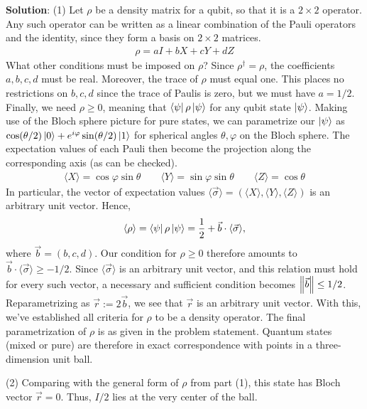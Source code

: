 \documentclass{book}
\begin{document}
    \textbf{Solution}: (1) Let $\rho$ be a density matrix for a qubit, so that it is a $2\times 2$ operator. Any such operator can be written as a linear combination of the Pauli operators and the identity, since they form a basis on $2\times 2$ matrices.
    \begin{align}
        \rho = a I + b X + c Y + d Z
    \end{align}
    What other conditions must be imposed on $\rho$? Since $\rho^\dagger = \rho$, the coefficients $a, b, c, d$ must be real. Moreover, the trace of $\rho$ must equal one. This places no restrictions on $b, c, d$ since the trace of Paulis is zero, but we must have $a = 1/2$. Finally, we need $\rho \geq 0$, meaning that $\bra{\psi}\rho \ket{\psi}$ for any qubit state $\ket{\psi}$. Making use of the Bloch sphere picture for pure states, we can parametrize our $\ket{\psi}$ as $\cos(\theta/2) \ket{0} + e^{i\varphi}\sin(\theta/2) \ket{1}$ for spherical angles $\theta, \varphi$ on the Bloch sphere. The expectation values of each Pauli then become the projection along the corresponding axis (as can be checked).
    \begin{align}
        \langle X\rangle = \cos\varphi \sin\theta \qquad \langle Y \rangle = \sin\varphi \sin\theta \qquad \langle Z \rangle = \cos\theta
    \end{align}
    In particular, the vector of expectation values $\langle \vec{\sigma}\rangle = (\langle X \rangle, \langle Y \rangle, \langle Z \rangle)$ is an arbitrary unit vector. Hence,
    \begin{align}
        \langle \rho \rangle = \bra{\psi} \rho \ket{\psi} = \frac{1}{2} + \vec{b} \cdot \langle \vec{\sigma} \rangle,
    \end{align}
    where $\vec{b} = (b,c,d)$.
    Our condition for $\rho \geq 0$ therefore amounts to $\vec{b} \cdot \langle \vec{\sigma} \rangle \geq -1/2$. Since $\langle \vec{\sigma} \rangle$ is an arbitrary unit vector, and this relation must hold for every such vector, a necessary and sufficient condition becomes $\norm{\vec{b}} \leq 1/2$. Reparametrizing as $\vec{r} := 2 \vec{b}$, we see that $\vec{r}$ is an arbitrary unit vector. With this, we've established all criteria for $\rho$ to be a density operator. The final parametrization of $\rho$ is as given in the problem statement. Quantum states (mixed or pure) are therefore in exact correspondence with points in a three-dimension unit ball. 

    (2) Comparing with the general form of $\rho$ from part (1), this state has Bloch vector $\vec{r} = 0$. Thus, $I/2$ lies at the very center of the ball.
\end{document}
